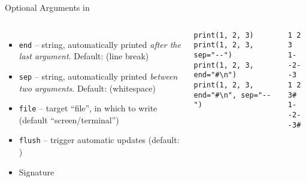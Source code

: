 \begin{frame}[fragile]{Optional Arguments in }
%
\vspace{-10pt}
\begin{columns}[t]
\begin{itemize}
\item \texttt{end} -- string, automatically printed \emph{after the last argument}. Default:  (line break)
\item \texttt{sep} -- string, automatically printed \emph{between two arguments}. Default:  (whitespace)
\item \texttt{file} -- target \enquote{file}, in which to write (default \enquote{screen/terminal})
\item \texttt{flush} -- trigger automatic updates (default: )
\item Signature 
\end{itemize}
%
\begin{codebox}
\begin{verbatim}
print(1, 2, 3)
print(1, 2, 3, sep="--")
print(1, 2, 3, end="#\n")
print(1, 2, 3, end="#\n", sep="--")
\end{verbatim}
\end{codebox}
%
\begin{cmdbox}
\begin{verbatim}
1 2 3
1--2--3
1 2 3#
1--2--3#
\end{verbatim}
\end{cmdbox}
\end{columns}
%
\end{frame}


